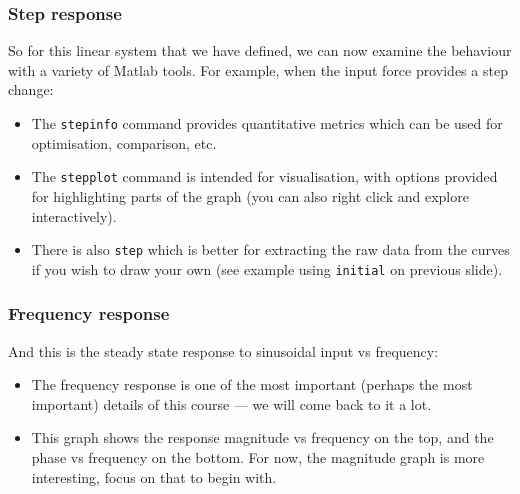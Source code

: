 \documentclass[9pt]{beamer-control}
\begin{document}


\begin{frame}
\frametitle{Step response}

So for this linear system that we have defined, we can now examine the behaviour with a variety of Matlab tools. For example, when the input force provides a step change:


\begin{itemize}
\item The \texttt{stepinfo} command provides quantitative metrics which can be used for optimisation, comparison, etc.
\item The \texttt{stepplot} command is intended for visualisation, with options provided for highlighting parts of the graph (you can also right click and explore interactively).
\item There is also \texttt{step} which is better for extracting the raw data from the curves if you wish to draw your own (see example using \texttt{initial} on previous slide).
\end{itemize}

\end{frame}


\begin{frame}
\frametitle{Frequency response}

And this is the steady state response to sinusoidal input vs frequency:


\begin{itemize}
\item The frequency response is one of the most important (perhaps the most important) details of this course --- we will come back to it a lot.
\item This graph shows the response magnitude vs frequency on the top, and the phase vs frequency on the bottom. For now, the magnitude graph is more interesting, focus on that to begin with.
\end{itemize}

\end{frame}
\end{document}
